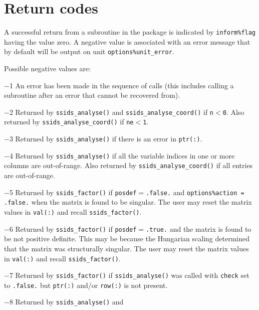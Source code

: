 \documentclass{spral}
\begin{document}

\section{Return codes} \label{errors}

A successful return from a subroutine in the package is indicated by
{\tt inform\%flag} having the value zero.
A negative value is associated with an error message that by default will
be output on unit {\tt options\%unit\_error}.

Possible negative values are:

\begin{description}
\item{$-$1} An error has been made in the sequence of calls (this includes
            calling a subroutine after an error that cannot be recovered from).
\item{$-$2} Returned by {\tt ssids\_analyse()} and {\tt ssids\_analyse\_coord()}
            if {\tt n$<$0}. Also returned by {\tt ssids\_analyse\_coord()} if
            {\tt ne$<$1}.
\item{$-$3} Returned by {\tt ssids\_analyse()} if there is an error in
            {\tt ptr(:)}.
\item{$-$4} Returned by {\tt ssids\_analyse()} if all the variable indices in
            one or more columns  are out-of-range. Also returned by
            {\tt ssids\_analyse\_coord()} if all entries are out-of-range.
\item{$-$5} Returned by {\tt ssids\_factor()} if
            {\tt posdef}$=${\tt .false.} and
            {\tt options\%action = .false.} when the matrix is found to be
            singular. The user may reset the matrix values in {\tt val(:)}
            and recall {\tt ssids\_factor()}.
\item{$-$6} Returned by {\tt ssids\_factor()} if
            {\tt posdef}$=${\tt .true.} and the matrix is found to
            be not positive definite. This may be because the Hungarian scaling
            determined that the matrix was structurally singular. The user may
            reset the matrix values in {\tt val(:)} and recall
            {\tt ssids\_factor()}.
\item{$-$7} Returned by {\tt ssids\_factor()} if {\tt ssids\_analyse()} was
            called with {\tt check} set to {\tt .false.} but {\tt ptr(:)}
            and/or {\tt row(:)} is not present.
\item{$-$8} Returned by {\tt ssids\_analyse()}  and

\end{description}
\end{document}
